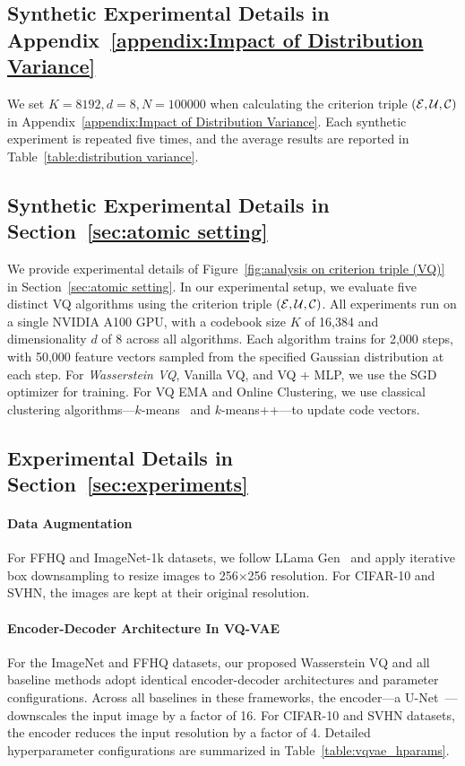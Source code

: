 \subsection{Synthetic Experimental Details in Appendix~\ref{appendix:Impact of Distribution Variance}} \label{appendix:details part4}
We set $K=8192, d=8, N=100000$ when calculating the criterion triple $(\mathcal{E}, \mathcal{U}, \mathcal{C})$ in Appendix~\ref{appendix:Impact of Distribution Variance}. Each synthetic experiment is repeated five times, and the average results are reported in Table~\ref{table:distribution variance}. 

\subsection{Synthetic Experimental Details in Section~\ref{sec:atomic setting}} \label{appendix:details part2}
We provide experimental details of Figure~\ref{fig:analysis on criterion triple (VQ)} in Section~\ref{sec:atomic setting}. In our experimental setup, we evaluate five distinct VQ algorithms using the criterion triple $(\mathcal{E}, \mathcal{U}, \mathcal{C})$. All experiments run on a single NVIDIA A100 GPU, with a codebook size $K$ of 16,384 and dimensionality $d$ of 8 across all algorithms. Each algorithm trains for 2,000 steps, with 50,000 feature vectors sampled from the specified Gaussian distribution at each step. For \emph{Wasserstein VQ}, Vanilla VQ, and VQ + MLP, we use the SGD optimizer for training. For VQ EMA and Online Clustering, we use classical clustering algorithms—$k$-means~\cite{Bradley1998RefiningIP} and $k$-means++\cite{Arthur2007kmeansTA}—to update code vectors. 



\subsection{Experimental Details in Section~\ref{sec:experiments}}
\label{appendix:experimental details}



\paragraph{Data Augmentation} For FFHQ and ImageNet-1k datasets, we follow LLama Gen~\cite{Sun2024AutoregressiveMB} and apply iterative box downsampling to resize images to 256×256 resolution. For CIFAR-10 and SVHN, the images are kept at their original resolution.

\paragraph{Encoder-Decoder Architecture In VQ-VAE} For the ImageNet and FFHQ datasets, our proposed Wasserstein VQ and all baseline methods adopt identical encoder-decoder architectures and parameter configurations. Across all baselines in these frameworks, the encoder—a U-Net~\cite{Ronneberger2015UNetCN}—downscales the input image by a factor of 16. For CIFAR-10 and SVHN datasets, the encoder reduces the input resolution by a factor of 4. Detailed hyperparameter configurations are summarized in Table~\ref{table:vqvae_hparams}.


